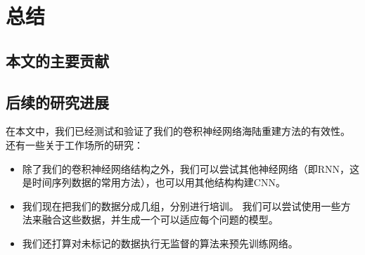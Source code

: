 \chapter{总结}
\section{本文的主要贡献}

\section{后续的研究进展}

在本文中，我们已经测试和验证了我们的卷积神经网络海陆重建方法的有效性。 还有一些关于工作场所的研究：
\begin{itemize}
	\item 除了我们的卷积神经网络结构之外，我们可以尝试其他神经网络（即RNN，这是时间序列数据的常用方法），也可以用其他结构构建CNN。
	\item 我们现在把我们的数据分成几组，分别进行培训。 我们可以尝试使用一些方法来融合这些数据，并生成一个可以适应每个问题的模型。
	\item 我们还打算对未标记的数据执行无监督的算法来预先训练网络。
\end{itemize}